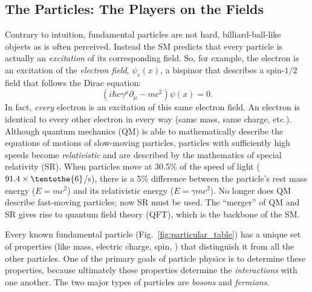 
\subsection{The Particles: The Players on the Fields}
Contrary to intuition, fundamental particles are not hard, billiard-ball-like objects as is often perceived.
Instead the SM predicts that every particle is actually an \emph{excitation} of its corresponding field.
So, for example, the electron is an excitation of the \emph{electron field}, $\psi_{e}(x)$, a bispinor that describes a spin-$1/2$ field that follows the Dirac equation: 
\begin{equation*}
    \left( i\hbar c \gamma^{\mu}{\partial}_{\mu} 
    - mc^{2} \right)\psi(x) = 0.
\end{equation*}
In fact, \emph{every} electron is an excitation of this same electron field. 
An electron is identical to every other electron in every way (same mass, same charge, etc.).
Although quantum mechanics (QM) is able to mathematically describe the equations of motions of slow-moving particles, particles with sufficiently high speeds become \emph{relativistic} and are described by the mathematics of special relativity (SR).
When particles move at 30.5\% of the speed of light ($91.4 \times \tentothe{6}$\meter/s), there is a 5\% difference between the particle's rest mass energy ($E = mc^2$) and its relativistic energy ($E = \gamma mc^2$).
No longer does QM describe fast-moving particles; now SR must be used.
The ``merger'' of QM and SR gives rise to quantum field theory (QFT), which is the backbone of the SM.

Every known fundamental particle (Fig.~\ref{fig:particular_table}) has a unique set of properties (like mass, electric charge, spin, \etc) that distinguish it from all the other particles. 
One of the primary goals of particle physics is to determine these properties, because ultimately these properties determine the  \emph{interactions} with one another. 
The two major types of particles are \emph{bosons} and \emph{fermions}.

